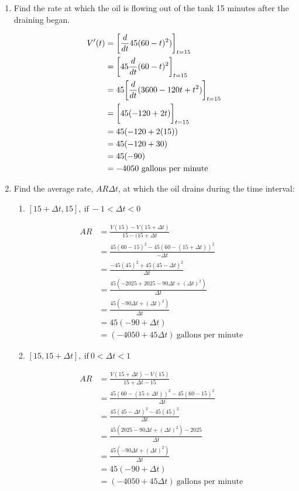 \documentclass[nooutcomes]{ximera}
\begin{document}
\begin{problem}
\begin{enumerate}
\begin{freeResponse}
			\end{freeResponse}
		\item Find the rate at which the oil is flowing out of the tank 15 minutes after the draining began.
			\begin{freeResponse}
			\begin{align*}
			V'(t)&= \bigg[ \frac{d }{d t} 45(60-t)^2) \bigg]_{t=15}\\
			&=\bigg[ 45 \frac{d }{d t} (60-t)^2 \bigg]_{t=15}\\
			&=45\bigg[ \frac{d }{d t}(3600-120t+t^2) \bigg]_{t=15}\\
			&=\bigg[ 45(-120+2t) \bigg]_{t=15}\\
			&=45(-120+2(15))\\
			&=45(-120+30)\\
			&=45(-90)\\
			&=-4050\ \text{gallons per minute}
			\end{align*}
			\end{freeResponse}
		\item Find the average rate, $AR \Delta t$, at which the oil drains during the time interval:
			\begin{enumerate}
				\item $[15+ \Delta t,15],\ \text{if}\ -1< \Delta t<0$
			\begin{freeResponse}
					\begin{align*}
					AR&= \frac{V(15)-V(15+\Delta t)}{15-(15+\Delta t}\\
					&=\frac{45(60-15)^2-45(60-(15+\Delta t))^2}{-\Delta t}\\
					&=\frac{-45(45)^2+45(45-\Delta t)^2}{\Delta t}\\
					&=\frac{45(-2025+2025-90\Delta t+(\Delta t)^2)}{\Delta t}\\
					&=\frac{45(-90\Delta t+(\Delta t)^2)}{\Delta t}\\
					&=45(-90+\Delta t)\\
					&=(-4050+45\Delta t)\ \text{gallons per minute}			
					\end{align*}
			\end{freeResponse}			

				\item $[15,15+ \Delta t],\ \text{if}\ 0< \Delta t<1$
			\begin{freeResponse}
					\begin{align*}
					AR&= \frac{V(15+\Delta t)-V(15)}{15+\Delta t-15}\\
					&=\frac{45(60-(15+\Delta t))^2-45(60-15)^2}{\Delta t}\\
					&=\frac{45(45-\Delta t)^2-45(45)^2}{\Delta t}\\
					&=\frac{45(2025-90\Delta t+(\Delta t)^2)-2025}{\Delta t}\\
					&=\frac{45(-90\Delta t+(\Delta t)^2)}{\Delta t}\\
					&=45(-90+\Delta t)\\
					&=(-4050+45\Delta t)\ \text{gallons per minute}			
					\end{align*}
			\end{freeResponse}
			\end{enumerate}


\end{enumerate}
\end{problem}
\end{document}
